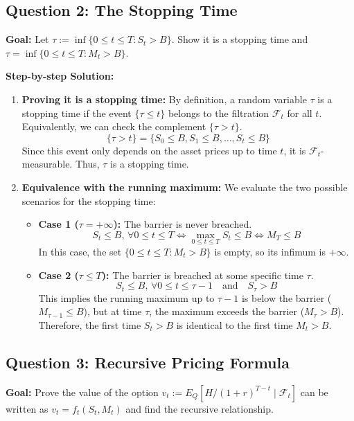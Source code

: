\subsection*{Question 2: The Stopping Time}
\textbf{Goal:} Let $\tau := \inf\{0 \le t \le T : S_t > B\}$. Show it is a stopping time and $\tau = \inf\{0 \le t \le T : M_t > B\}$.

\vspace{0.5cm}
\noindent \textbf{Step-by-step Solution:}
\begin{enumerate}
    \item \textbf{Proving it is a stopping time:} By definition, a random variable $\tau$ is a stopping time if the event $\{\tau \le t\}$ belongs to the filtration $\mathcal{F}_t$ for all $t$. Equivalently, we can check the complement $\{\tau > t\}$.
    \begin{equation*}
        \{\tau > t\} = \{S_0 \le B, S_1 \le B, \dots, S_t \le B\}
    \end{equation*}
    Since this event only depends on the asset prices up to time $t$, it is $\mathcal{F}_t$-measurable. Thus, $\tau$ is a stopping time.
    \item \textbf{Equivalence with the running maximum:} We evaluate the two possible scenarios for the stopping time:
    \begin{itemize}
        \item \textbf{Case 1 ($\tau = +\infty$):} The barrier is never breached. 
        \begin{equation*}
            S_t \le B, \, \forall 0 \le t \le T \iff \max_{0 \le t \le T} S_t \le B \iff M_T \le B
        \end{equation*}
        In this case, the set $\{0 \le t \le T : M_t > B\}$ is empty, so its infimum is $+\infty$.
        \item \textbf{Case 2 ($\tau \le T$):} The barrier is breached at some specific time $\tau$.
        \begin{equation*}
            S_t \le B, \, \forall 0 \le t \le \tau-1 \quad \text{and} \quad S_\tau > B
        \end{equation*}
        This implies the running maximum up to $\tau-1$ is below the barrier ($M_{\tau-1} \le B$), but at time $\tau$, the maximum exceeds the barrier ($M_\tau > B$). Therefore, the first time $S_t > B$ is identical to the first time $M_t > B$.
    \end{itemize}
\end{enumerate}

\subsection*{Question 3: Recursive Pricing Formula}
\textbf{Goal:} Prove the value of the option $v_t := E_Q[H/(1+r)^{T-t} \mid \mathcal{F}_t]$ can be written as $v_t = f_t(S_t, M_t)$ and find the recursive relationship.

